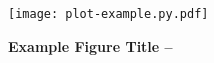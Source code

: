 
\begin{figure}[t]

  \texttt{[image: plot-example.py.pdf]}

  \caption{\textbf{Example Figure Title --} }
  \label{fig-plot-example}

\end{figure}

